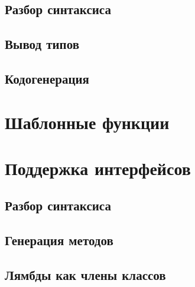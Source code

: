 \subsection{Разбор синтаксиса}
\subsection{Вывод типов}
\subsection{Кодогенерация}

\section{Шаблонные функции}

\section{Поддержка интерфейсов}
\subsection{Разбор синтаксиса}
\subsection{Генерация методов}
\subsection{Лямбды как члены классов}

\chapterconclusion
